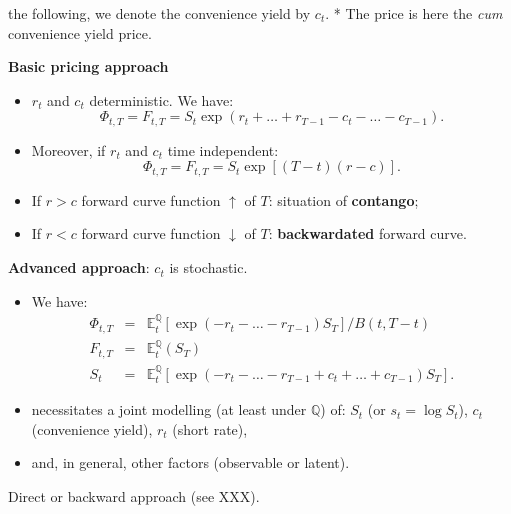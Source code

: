 \documentclass[
  12pt,
]{book}
\providecommand{\tightlist}{%
  \setlength{\itemsep}{0pt}\setlength{\parskip}{0pt}}
\theoremstyle{definition}
\theoremstyle{definition}
\theoremstyle{definition}
\theoremstyle{definition}
\theoremstyle{remark}
\begin{document}
the following, we denote the convenience yield by \(c_t\).
* The price is here the \emph{cum} convenience yield price.

\textbf{Basic pricing approach}

\begin{itemize}
\tightlist
\item
  \(r_t\) and \(c_t\) deterministic. We have:
  \[
  \Phi_{t,T} = F_{t,T} = S_t \exp (r_t + \ldots + r_{T-1} - c_t - \ldots - c_{T-1}).
  \]
\item
  Moreover, if \(r_t\) and \(c_t\) time independent:
  \[
  \Phi_{t,T} = F_{t,T} = S_t \exp [(T-t)(r-c)].
  \]
\item
  If \(r>c\) forward curve function \(\uparrow\) of \(T\): situation of \textbf{contango};
\item
  If \(r<c\) forward curve function \(\downarrow\) of \(T\): \textbf{backwardated} forward curve.
\end{itemize}

\textbf{Advanced approach}: \(c_t\) is stochastic.

\begin{itemize}
\tightlist
\item
  We have:
  \begin{eqnarray}
  \Phi_{t,T} &=& \mathbb{E}^{\mathbb{Q}}_t [\exp (-r_t - \ldots - r_{T-1}) S_T]/B(t,T-t) \label{eq:convenience}\\
  F_{t,T} &=& \mathbb{E}^{\mathbb{Q}}_t (S_T) \label{eq:convenience2}\\
  S_t &=& \mathbb{E}^{\mathbb{Q}}_t [\exp (-r_t - \ldots - r_{T-1} + c_t + \ldots + c_{T-1}) S_T] \label{eq:convenience3}.
  \end{eqnarray}
\item
  necessitates a joint modelling (at least under \(\mathbb{Q}\)) of: \(S_t\) (or \(s_t = \log S_t\)), \(c_t\) (convenience yield), \(r_t\) (short rate),
\item
  and, in general, other factors (observable or latent).
\end{itemize}

Direct or backward approach (see XXX).
\end{document}
